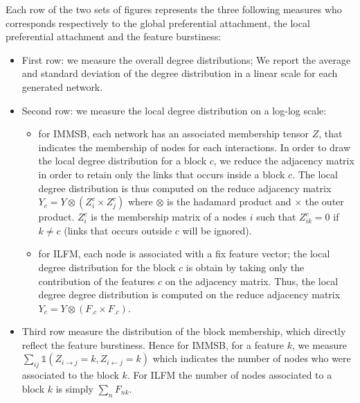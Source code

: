 Each row of the two sets of figures represents the three following measures who corresponds respectively to the global preferential attachment, the local preferential attachment and the feature burstiness:
\begin{itemize}
    \item First row: we measure the overall degree distributions; We report the average and standard deviation of the degree distribution in a linear scale for each generated network.
    \item Second row: we measure the local degree distribution on a log-log scale:
        \begin{itemize}
            \item for IMMSB, each network has an associated membership tensor $Z$, that indicates the membership of nodes for each  interactions. In order to draw the local degree distribution for a block $c$, we reduce the adjacency matrix in order to retain only the links that occurs inside a block $c$. The local degree distribution is thus computed on the reduce adjacency matrix $Y_c = Y \otimes (Z_i^c \times Z_j^c)$ where $\otimes$ is the hadamard product and $\times$ the outer product. $Z_i^c$ is the membership matrix of a nodes $i$ such that $Z_{ik}^c=0$ if $k\neq c$ (links that occurs outside $c$ will be ignored).
            \item for ILFM, each node is associated with a fix feature vector; the local degree distribution for the block $c$ is obtain by taking only the contribution of the features $c$ on the adjacency matrix. Thus, the local degree degree distribution is computed on the reduce adjacency matrix $Y_c = Y \otimes (F_{.c}\times F_{.c})$. 
        \end{itemize}
    \item Third row measure the distribution of the block membership, which directly reflect the feature burstiness. Hence for IMMSB, for a feature $k$, we measure $\sum_{ij} \mathds{1}(Z_{i\rightarrow j} = k, Z_{i\leftarrow j} = k)$ which indicates the number of nodes who were associated to the block $k$. For ILFM the number of nodes associated to a block $k$ is simply $\sum_n F_{nk}$.
\end{itemize}



